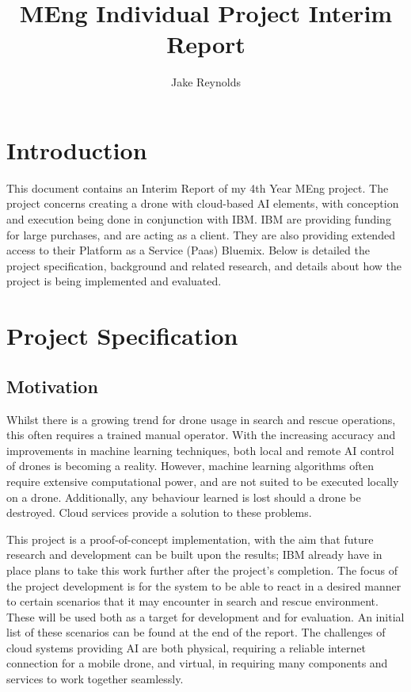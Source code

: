 \documentclass{article}
\begin{document}
\title{MEng Individual Project Interim Report}
\author{Jake Reynolds}

\maketitle

\tableofcontents

\section{Introduction}
This document contains an Interim Report of my 4th Year MEng project. The project concerns creating a drone with cloud-based AI elements, with conception and execution being done in conjunction with IBM. IBM are providing funding for large purchases, and are acting as a client. They are also providing extended access to their Platform as a Service (Paas) Bluemix. Below is detailed the project specification, background and related research, and details about how the project is being implemented and evaluated.


\section{Project Specification}
\subsection{Motivation}
Whilst there is a growing trend for drone usage in search and rescue operations, this often requires a trained manual operator. With the increasing accuracy and improvements in machine learning techniques, both local and remote AI control of drones is becoming a reality. However, machine learning algorithms often require extensive computational power, and are not suited to be executed locally on a drone. Additionally, any behaviour learned is lost should a drone be destroyed. Cloud services provide a solution to these problems.

\vspace{\baselineskip} \noindent
This project is a proof-of-concept implementation, with the aim that future research and development can be built upon the results; IBM already have in place plans to take this work further after the project's completion. The focus of the project development is for the system to be able to react in a desired manner to certain scenarios that it may encounter in search and rescue environment. These will be used both as a target for development and for evaluation. An initial list of these scenarios can be found at the end of the report. The challenges of cloud systems providing AI are both physical, requiring a reliable internet connection for a mobile drone, and virtual, in requiring many components and services to work together seamlessly.
\end{document}
